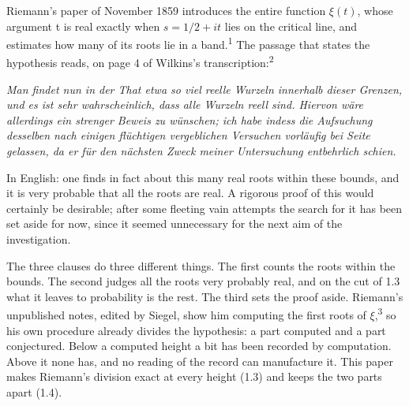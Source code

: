\documentclass[10pt]{article}
\begin{document}
Riemann's paper of November 1859 introduces the entire function
\(\xi(t)\), whose argument t is real exactly when \(s = 1/2 + it\) lies
on the critical line, and estimates how many of its roots lie in a
band.\textsuperscript{1} The passage that states the hypothesis reads,
on page 4 of Wilkins's transcription:\textsuperscript{2}

\emph{Man findet nun in der That etwa so viel reelle Wurzeln innerhalb
dieser Grenzen, und es ist sehr wahrscheinlich, dass alle Wurzeln reell
sind. Hiervon wäre allerdings ein strenger Beweis zu wünschen; ich habe
indess die Aufsuchung desselben nach einigen flüchtigen vergeblichen
Versuchen vorläufig bei Seite gelassen, da er für den nächsten Zweck
meiner Untersuchung entbehrlich schien.}

In English: one finds in fact about this many real roots within these
bounds, and it is very probable that all the roots are real. A rigorous
proof of this would certainly be desirable; after some fleeting vain
attempts the search for it has been set aside for now, since it seemed
unnecessary for the next aim of the investigation.

The three clauses do three different things. The first counts the roots
within the bounds. The second judges all the roots very probably real,
and on the cut of 1.3 what it leaves to probability is the rest. The
third sets the proof aside. Riemann's unpublished notes, edited by
Siegel, show him computing the first roots of
\(\xi\),\textsuperscript{3} so his own procedure already divides the
hypothesis: a part computed and a part conjectured. Below a computed
height a bit has been recorded by computation. Above it none has, and no
reading of the record can manufacture it. This paper makes Riemann's
division exact at every height (1.3) and keeps the two parts apart
(1.4).
\end{document}
